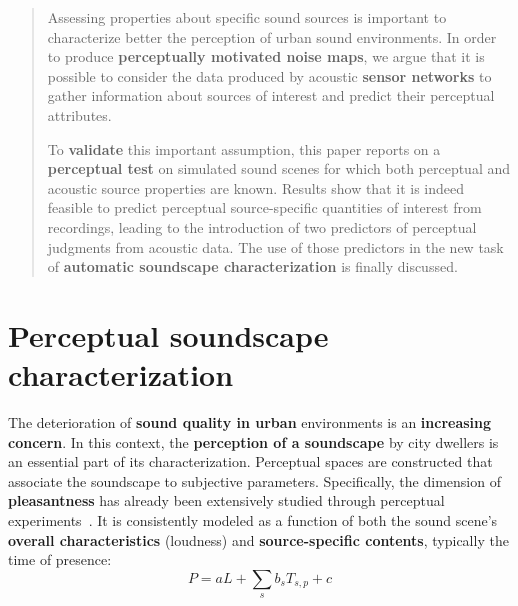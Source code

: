 \documentclass[a0,portrait]{a0poster}
\begin{document}
\begin{multicols}{2} %


\color{Navy} %

\begin{abstract}

Assessing properties about specific sound sources is important to characterize better the perception of urban sound environments. In order to produce \textbf{perceptually motivated noise maps}, we argue that it is possible to consider the data produced by acoustic \textbf{sensor networks} to gather information about sources of interest and predict their perceptual attributes.

To \textbf{validate} this important assumption, this paper reports on a \textbf{perceptual test} on simulated sound scenes for which both perceptual and acoustic source properties are known. Results show that it is indeed feasible to predict perceptual source-specific quantities of interest from recordings, leading to the introduction of two predictors of perceptual judgments from acoustic data. The use of those predictors in the new task of \textbf{automatic soundscape characterization} is finally discussed.

\end{abstract}




\color{SaddleBrown} %

\section*{Perceptual soundscape characterization}

The deterioration of \textbf{sound quality in urban} environments is an \textbf{increasing concern}. In this context, the \textbf{perception of a soundscape} by city dwellers is an essential part of its characterization. Perceptual spaces are constructed that associate the soundscape to subjective parameters. Specifically, the dimension of \textbf{pleasantness} has already been extensively studied through perceptual experiments~\cite{aumond2017}. It is consistently modeled as a function of both the sound scene's \textbf{overall characteristics} (loudness) and \textbf{source-specific contents}, typically the time of presence:
\begin{equation}
P = aL + \sum_s b_sT_{s,p} + c
\end{equation}


\end{multicols}
\end{document}
